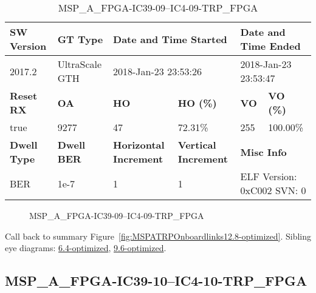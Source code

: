 \begin{table}[h]
\centering
\caption{MSP\_A\_FPGA-IC39-09--IC4-09-TRP\_FPGA}
\label{tab:MSPAFPGAIC3909IC409TRPFPGA12.8-optimized}
\begin{tabular}{@{}|l|l|l|l|l|l|@{}}
\toprule
\textbf{SW Version}                & \textbf{GT Type}   & \multicolumn{2}{l|}{\textbf{Date and Time Started}}            & \multicolumn{2}{l|}{\textbf{Date and Time Ended}}        \\ \midrule
2017.2                       & UltraScale GTH          & \multicolumn{2}{l|}{2018-Jan-23 23:53:26}                   & \multicolumn{2}{l|}{2018-Jan-23 23:53:47}               \\ \midrule
\textbf{Reset RX}                  & \textbf{OA} & \textbf{HO}   & \textbf{HO (\%)} & \textbf{VO} & \textbf{VO (\%)} \\ \midrule
true & 9277        & 47          & 72.31\%        & 255        & 100.00\%       \\ \midrule
\textbf{Dwell Type}                & \textbf{Dwell BER} & \textbf{Horizontal Increment} & \textbf{Vertical Increment}    & \multicolumn{2}{l|}{\textbf{Misc Info}}                  \\ \midrule
BER                            & 1e-7        & 1        & 1           & \multicolumn{2}{l|}{ELF Version: 0xC002 SVN: 0}                         \\ \bottomrule
\end{tabular}
\end{table}

\begin{figure}[h]
\caption{MSP\_A\_FPGA-IC39-09--IC4-09-TRP\_FPGA} \label{fig:MSPAFPGAIC3909IC409TRPFPGA12.8-optimized}
\end{figure}

Call back to summary Figure~\ref{fig:MSPATRPOnboardlinks12.8-optimized}.
Sibling eye diagrams: \hyperref[sec:MSPAFPGAIC3909IC409TRPFPGA6.4-optimized]{6.4-optimized}, \hyperref[sec:MSPAFPGAIC3909IC409TRPFPGA9.6-optimized]{9.6-optimized}.

\clearpage
\newpage


\subsection{MSP\_A\_FPGA-IC39-10--IC4-10-TRP\_FPGA}\label{sec:MSPAFPGAIC3910IC410TRPFPGA12.8-optimized}

